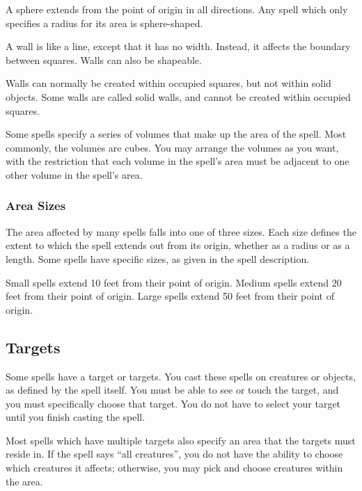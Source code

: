              A sphere extends from the point of origin in all directions.
            Any spell which only specifies a radius for its area is sphere-shaped.

             A wall is like a line, except that it has no width.
            Instead, it affects the boundary between squares.
            Walls can also be shapeable.

            Walls can normally be created within occupied squares, but not within solid objects.
            Some walls are called solid walls, and cannot be created within occupied squares.

             Some spells specify a series of volumes that make up the area of the spell.
            Most commonly, the volumes are cubes.
            You may arrange the volumes as you want, with the restriction that each volume in the spell's area must be adjacent to one other volume in the spell's area.

        \subsubsection{Area Sizes}

            The area affected by many spells falls into one of three sizes.
            Each size defines the extent to which the spell extends out from its origin, whether as a radius or as a length.
            Some spells have specific sizes, as given in the spell description.

             Small spells extend 10 feet from their point of origin.
             Medium spells extend 20 feet from their point of origin.
             Large spells extend 50 feet from their point of origin.

    \subsection{Targets}
        Some spells have a target or targets.
        You cast these spells on creatures or objects, as defined by the spell itself.
        You must be able to see or touch the target, and you must specifically choose that target.
        You do not have to select your target until you finish casting the spell.

         Most spells which have multiple targets also specify an area that the targets must reside in.
        If the spell says ``all creatures'', you do not have the ability to choose which creatures it affects; otherwise, you may pick and choose creatures within the area.

